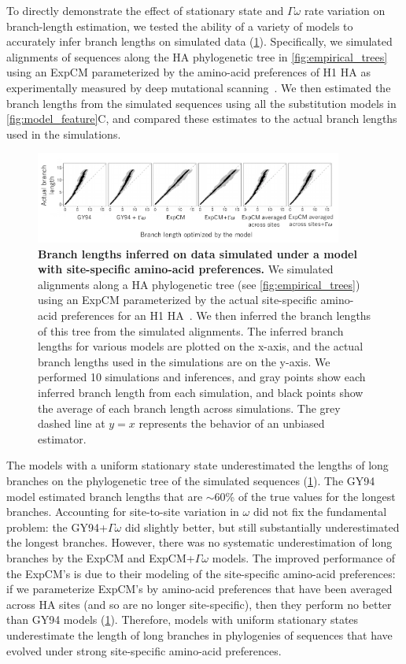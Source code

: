 \documentclass[11pt]{article}
\begin{document}
To directly demonstrate the effect of stationary state and $\Gamma\omega$ rate variation on branch-length estimation, we tested the ability of a variety of models to accurately infer branch lengths on simulated data (\ref{fig:simulations}).
Specifically, we simulated alignments of sequences along the HA phylogenetic tree in \ref{fig:empirical_trees} using an ExpCM parameterized by the amino-acid preferences of H1 HA as experimentally measured by deep mutational scanning~\citep{doud2016accurate}. We then estimated the branch lengths from the simulated sequences using all the substitution models in \ref{fig:model_feature}C, and compared these estimates to the actual branch lengths used in the simulations.

\begin{figure}
\centerline{\includegraphics[width=0.9\textwidth]{figures/simulations}}
\caption{\label{fig:simulations}
\textbf{Branch lengths inferred on data simulated under a model with site-specific amino-acid preferences.} 
We simulated alignments along a HA phylogenetic tree (see \ref{fig:empirical_trees}) using an ExpCM parameterized by the actual site-specific amino-acid preferences for an H1 HA~\citep{doud2016accurate}.
We then inferred the branch lengths of this tree from the simulated alignments.
The inferred branch lengths for various models are plotted on the x-axis, and the actual branch lengths used in the simulations are on the y-axis.
We performed 10 simulations and inferences, and gray points show each inferred branch length from each simulation, and black points show the average of each branch length across simulations.
The grey dashed line at $y=x$ represents the behavior of an unbiased estimator. 
}
\end{figure}

The models with a uniform stationary state underestimated the lengths of long branches on the phylogenetic tree of the simulated sequences (\ref{fig:simulations}). 
The GY94 model estimated branch lengths that are $\sim$60\% of the true values for the longest branches. 
Accounting for site-to-site variation in $\omega$ did not fix the fundamental problem: the GY94+$\Gamma\omega$ did slightly better, but still substantially underestimated the longest branches.
However, there was no systematic underestimation of long branches by the ExpCM and ExpCM+$\Gamma\omega$ models.
The improved performance of the ExpCM's is due to their modeling of the site-specific amino-acid preferences: if we parameterize ExpCM's by amino-acid preferences that have been averaged across HA sites (and so are no longer site-specific), then they perform no better than GY94 models (\ref{fig:simulations}).
Therefore, models with uniform stationary states underestimate the length of long branches in phylogenies of sequences that have evolved under strong site-specific amino-acid preferences.
\end{document}
